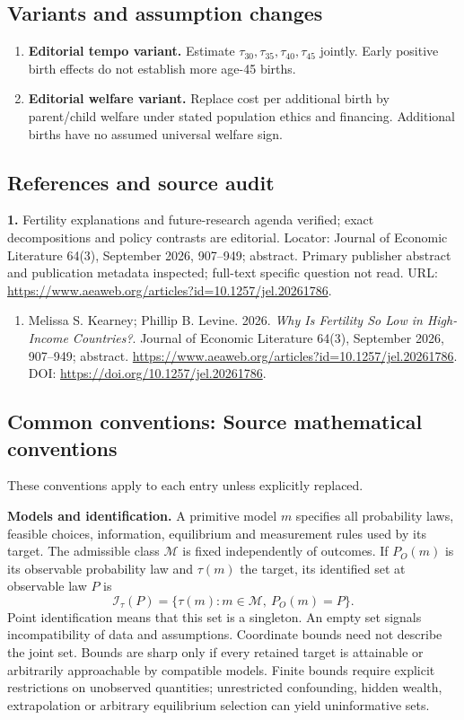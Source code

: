 \documentclass[11pt,a4paper]{article}
\begin{document}
\subsection*{Variants and assumption changes}
\begin{enumerate}
\item \textbf{Editorial tempo variant.} Estimate \(\tau_{30},\tau_{35},\tau_{40},\tau_{45}\) jointly. Early positive birth effects do not establish more age-45 births.
\item \textbf{Editorial welfare variant.} Replace cost per additional birth by parent/child welfare under stated population ethics and financing. Additional births have no assumed universal welfare sign.
\end{enumerate}
\subsection*{References and source audit}
\textbf{1.} Fertility explanations and future-research agenda verified; exact decompositions and policy contrasts are editorial. Locator: Journal of Economic Literature 64(3), September 2026, 907–949; abstract. Primary publisher abstract and publication metadata inspected; full-text specific question not read. URL: \url{https://www.aeaweb.org/articles?id=10.1257/jel.20261786}.
\begin{enumerate}\raggedright
\item\hypertarget{definitions:source:30007738:1}{} Melissa S. Kearney; Phillip B. Levine. 2026. \emph{Why Is Fertility So Low in High-Income Countries?}. Journal of Economic Literature 64(3), September 2026, 907–949; abstract.
\url{https://www.aeaweb.org/articles?id=10.1257/jel.20261786}.
DOI: \url{https://doi.org/10.1257/jel.20261786}.
\end{enumerate}

\subsection*{Common conventions: Source mathematical conventions}

These conventions apply to each entry unless explicitly replaced.

\textbf{Models and identification.} A primitive model \(m\) specifies all probability laws, feasible choices, information, equilibrium and measurement rules used by its target. The admissible class \(\mathcal M\) is fixed independently of outcomes. If \(P_O(m)\) is its observable probability law and \(\tau(m)\) the target, its identified set at observable law \(P\) is
\[
 \mathcal I_\tau(P)=\{\tau(m):m\in\mathcal M,\ P_O(m)=P\}.
\]
Point identification means that this set is a singleton. An empty set signals incompatibility of data and assumptions. Coordinate bounds need not describe the joint set. Bounds are sharp only if every retained target is attainable or arbitrarily approachable by compatible models. Finite bounds require explicit restrictions on unobserved quantities; unrestricted confounding, hidden wealth, extrapolation or arbitrary equilibrium selection can yield uninformative sets.
\end{document}
